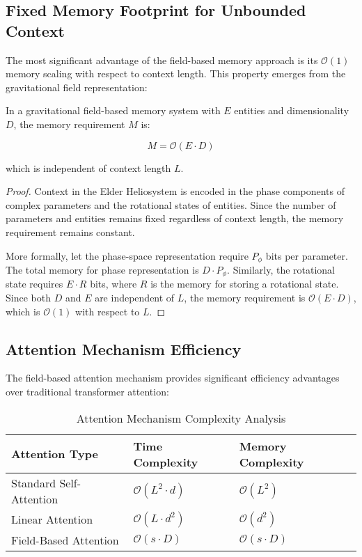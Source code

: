 \subsection{Fixed Memory Footprint for Unbounded Context}

The most significant advantage of the field-based memory approach is its $\mathcal{O}(1)$ memory scaling with respect to context length. This property emerges from the gravitational field representation:

\begin{theorem}
In a gravitational field-based memory system with $E$ entities and dimensionality $D$, the memory requirement $M$ is:

\begin{equation}
M = \mathcal{O}(E \cdot D)
\end{equation}

which is independent of context length $L$.
\end{theorem}

\begin{proof}
Context in the Elder Heliosystem is encoded in the phase components of complex parameters and the rotational states of entities. Since the number of parameters and entities remains fixed regardless of context length, the memory requirement remains constant.

More formally, let the phase-space representation require $P_{\phi}$ bits per parameter. The total memory for phase representation is $D \cdot P_{\phi}$. Similarly, the rotational state requires $E \cdot R$ bits, where $R$ is the memory for storing a rotational state. Since both $D$ and $E$ are independent of $L$, the memory requirement is $\mathcal{O}(E \cdot D)$, which is $\mathcal{O}(1)$ with respect to $L$.
\end{proof}

\subsection{Attention Mechanism Efficiency}

The field-based attention mechanism provides significant efficiency advantages over traditional transformer attention:

\begin{table}[ht]
\centering
\caption{Attention Mechanism Complexity Analysis}
\begin{tabular}{|p{4cm}|p{4cm}|p{4cm}|}
\hline
\textbf{Attention Type} & \textbf{Time Complexity} & \textbf{Memory Complexity} \\
\hline
Standard Self-Attention & $\mathcal{O}(L^2 \cdot d)$ & $\mathcal{O}(L^2)$ \\
\hline
Linear Attention & $\mathcal{O}(L \cdot d^2)$ & $\mathcal{O}(d^2)$ \\
\hline
Field-Based Attention & $\mathcal{O}(s \cdot D)$ & $\mathcal{O}(s \cdot D)$ \\
\hline
\end{tabular}
\end{table}

